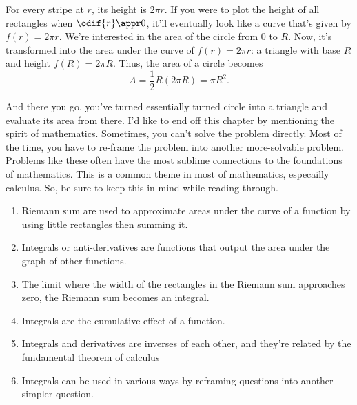 For every stripe at $r$, its height is $2\pi r$. If you were to plot the height of all rectangles when $\odif{r} \appr 0$, it'll eventually look like a curve that's given by $f(r) = 2\pi r$. We're interested in the area of the circle from $0$ to $R$. Now, it's transformed into the area under the curve of $f(r) = 2\pi r$: a triangle with base $R$ and height $f(R) = 2\pi R$. Thus, the area of a circle becomes
\begin{equation*}
	A = \frac{1}{2}R(2\pi R) = \pi R^2.
\end{equation*}

And there you go, you've turned essentially turned circle into a triangle and evaluate its area from there. I'd like to end off this chapter by mentioning the spirit of mathematics. Sometimes, you can't solve the problem directly. Most of the time, you have to re-frame the problem into another more-solvable problem. Problems like these often have the most sublime connections to the foundations of mathematics. This is a common theme in most of mathematics, especailly calculus. So, be sure to keep this in mind while reading through.

\conclusion

\begin{enumerate}
	\item Riemann sum are used to approximate areas under the curve of a function by using little rectangles then summing it.
	\item Integrals or anti-derivatives are functions that output the area under the graph of other functions.
	\item The limit where the width of the rectangles in the Riemann sum approaches zero, the Riemann sum becomes an integral.
	\item Integrals are the cumulative effect of a function.
	\item Integrals and derivatives are inverses of each other, and they're related by the fundamental theorem of calculus
	\item Integrals can be used in various ways by reframing questions into another simpler question.
\end{enumerate}
